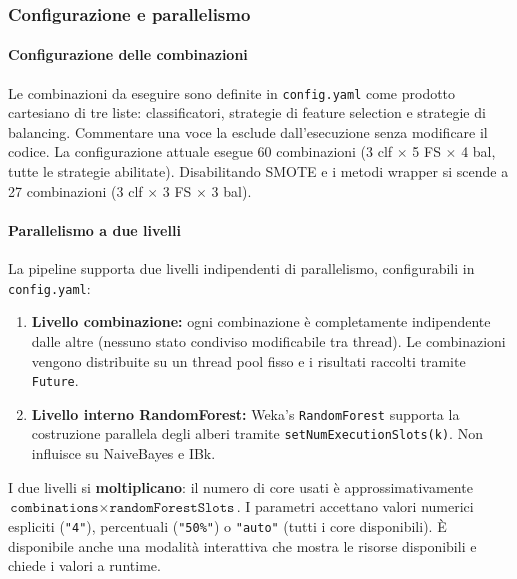 \subsubsection{Configurazione e parallelismo}

\paragraph{Configurazione delle combinazioni}

Le combinazioni da eseguire sono definite in \texttt{config.yaml} come prodotto cartesiano
di tre liste: classificatori, strategie di feature selection e strategie di balancing.
Commentare una voce la esclude dall'esecuzione senza modificare il codice. La
configurazione attuale esegue 60 combinazioni (3 clf $\times$ 5 FS $\times$ 4 bal, tutte
le strategie abilitate). Disabilitando SMOTE e i metodi wrapper si scende a 27
combinazioni (3 clf $\times$ 3 FS $\times$ 3 bal).

\paragraph{Parallelismo a due livelli}

La pipeline supporta due livelli indipendenti di parallelismo, configurabili in
\texttt{config.yaml}:

\begin{enumerate}
\item \textbf{Livello combinazione:} ogni combinazione è completamente indipendente dalle
altre (nessuno stato condiviso modificabile tra thread). Le combinazioni vengono
distribuite su un thread pool fisso e i risultati raccolti tramite \texttt{Future}.

\item \textbf{Livello interno RandomForest:} Weka's \texttt{RandomForest} supporta la
costruzione parallela degli alberi tramite \texttt{setNumExecutionSlots(k)}. Non influisce
su NaiveBayes e IBk.
\end{enumerate}

I due livelli si \textbf{moltiplicano}: il numero di core usati è approssimativamente
$\texttt{combinations} \times \texttt{randomForestSlots}$. I parametri accettano valori
numerici espliciti (\texttt{"4"}), percentuali (\texttt{"50\%"}) o \texttt{"auto"} (tutti
i core disponibili). È disponibile anche una modalità interattiva che mostra le risorse
disponibili e chiede i valori a runtime.

